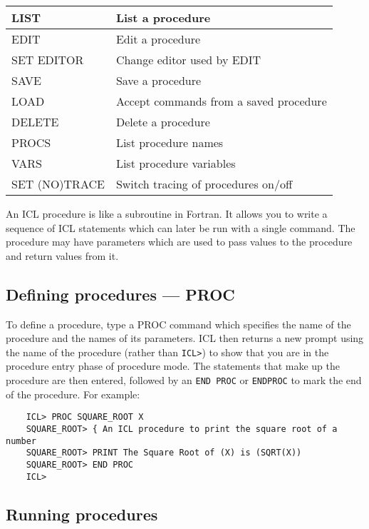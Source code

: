 \begin{center}
\begin{tabular}{|l|l|}
\hline
LIST        & List a procedure \\
\hline
EDIT        & Edit a procedure \\
SET EDITOR  & Change editor used by EDIT \\
\hline
SAVE        & Save a procedure \\
LOAD        & Accept commands from a saved procedure \\
DELETE      & Delete a procedure \\
\hline
PROCS       & List procedure names \\
VARS        & List procedure variables \\
\hline
SET (NO)TRACE   & Switch tracing of procedures on/off \\
\hline
\end{tabular}
\end{center}

An ICL procedure is like a subroutine in Fortran.
It allows you to write a sequence of ICL statements which can later be run with
a single command.
The procedure may have parameters which are used to pass values to the procedure
and return values from it.

\subsection{Defining procedures --- PROC}

To define a procedure, type a PROC command which specifies the name of the
procedure and the names of its parameters.
ICL then returns a new prompt using the name of the procedure (rather than
\verb+ICL>+) to show that you are in the procedure entry phase of procedure mode.
The statements that make up the procedure are then entered, followed by an
\verb+END PROC+ or \verb+ENDPROC+ to mark the end of the procedure.
For example:

\begin{small}
\begin{verbatim}
    ICL> PROC SQUARE_ROOT X
    SQUARE_ROOT> { An ICL procedure to print the square root of a number
    SQUARE_ROOT> PRINT The Square Root of (X) is (SQRT(X))
    SQUARE_ROOT> END PROC
    ICL>
\end{verbatim}
\end{small}


\subsection{Running procedures}

